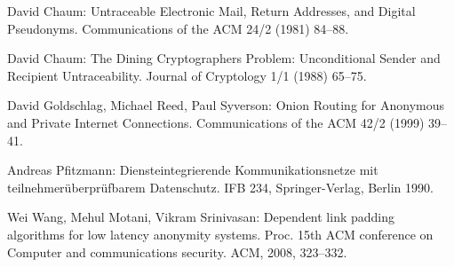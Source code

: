 \documentclass[
    fontsize=12pt,
    headings=small,
    parskip=half,           %
    bibliography=totoc,
    numbers=noenddot,       %
    open=any,               %
    ]{scrreprt}
\begin{document}
David Chaum: Untraceable Electronic Mail, Return Addresses, and Digital Pseudonyms. Communications of the ACM 24/2 (1981) 84--88.

David Chaum: The Dining Cryptographers Problem: Unconditional Sender and Recipient Untraceability. Journal of Cryptology 1/1 (1988) 65--75.

David Goldschlag, Michael Reed, Paul Syverson: Onion Routing for Anonymous and Private Internet Connections. Communications of the ACM 42/2 (1999) 39--41.

Andreas Pfitzmann: Diensteintegrierende Kommunikationsnetze mit teilnehmerüberprüfbarem Datenschutz. IFB 234, Springer-Verlag, Berlin 1990.

Wei Wang, Mehul Motani, Vikram Srinivasan: Dependent link padding algorithms for low latency anonymity systems. Proc. 15th ACM conference on Computer and communications security. ACM, 2008, 323--332.


\listoftodos
\end{document}
